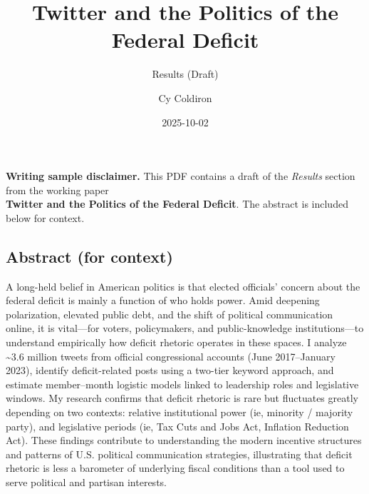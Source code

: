 \documentclass[
]{article}
\title{Twitter and the Politics of the Federal Deficit}
\subtitle{Results (Draft)}
\author{Cy Coldiron}
\date{2025-10-02}
\renewcommand*\contentsname{Table of contents}
\newcommand\contentsname{Table of contents}
\begin{document}
\maketitle

\renewcommand*\contentsname{Table of contents}
{
\hypersetup{linkcolor=}
\setcounter{tocdepth}{3}
\tableofcontents
}

\begin{tcolorbox}[enhanced jigsaw, breakable, bottomtitle=1mm, opacitybacktitle=0.6, left=2mm, rightrule=.15mm, title=\textcolor{quarto-callout-important-color}{\faExclamation}\hspace{0.5em}{Important}, coltitle=black, toptitle=1mm, colback=white, arc=.35mm, titlerule=0mm, bottomrule=.15mm, colframe=quarto-callout-important-color-frame, leftrule=.75mm, colbacktitle=quarto-callout-important-color!10!white, opacityback=0, toprule=.15mm]

\textbf{Writing sample disclaimer.} This PDF contains a draft of the
\emph{Results} section from the working paper\\
\textbf{Twitter and the Politics of the Federal Deficit}. The abstract
is included below for context.

\end{tcolorbox}

\subsection{Abstract (for context)}\label{abstract-for-context}

A long-held belief in American politics is that elected officials'
concern about the federal deficit is mainly a function of who holds
power. Amid deepening polarization, elevated public debt, and the shift
of political communication online, it is vital---for voters,
policymakers, and public-knowledge institutions---to understand
empirically how deficit rhetoric operates in these spaces. I analyze
\textasciitilde3.6 million tweets from official congressional accounts
(June 2017--January 2023), identify deficit-related posts using a
two-tier keyword approach, and estimate member--month logistic models
linked to leadership roles and legislative windows. My research confirms
that deficit rhetoric is rare but fluctuates greatly depending on two
contexts: relative institutional power (ie, minority / majority party),
and legislative periods (ie, Tax Cuts and Jobs Act, Inflation Reduction
Act). These findings contribute to understanding the modern incentive
structures and patterns of U.S. political communication strategies,
illustrating that deficit rhetoric is less a barometer of underlying
fiscal conditions than a tool used to serve political and partisan
interests.
\end{document}

